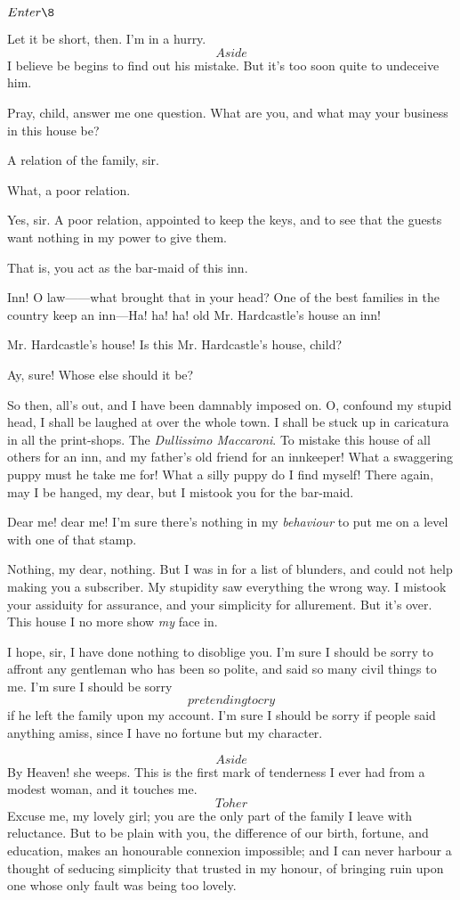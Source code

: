 \documentclass{book}
\begin{document}
\(Enter \8\)


\8  Let it be short, then.  I'm in a hurry.  \[Aside\]  I
believe be begins to find out his mistake.  But it's too soon quite to
undeceive him.

\2  Pray, child, answer me one question.  What are you, and what
may your business in this house be?

\8  A relation of the family, sir.

\2  What, a poor relation.

\8  Yes, sir.  A poor relation, appointed to keep the
keys, and to see that the guests want nothing in my power to give them.

\2  That is, you act as the bar-maid of this inn.

\8  Inn!  O law------what brought that in your head?  One
of the best families in the country keep an inn---Ha! ha! ha! old Mr.
Hardcastle's house an inn!

\2  Mr. Hardcastle's house!  Is this Mr. Hardcastle's house,
child?

\8  Ay, sure!  Whose else should it be?

\2  So then, all's out, and I have been damnably imposed on.  O,
confound my stupid head, I shall be laughed at over the whole town.  I
shall be stuck up in caricatura in all the print-shops.  The
\textit{Dullissimo Maccaroni}.  To mistake this house of all others for an inn, and my
father's old friend for an innkeeper!  What a swaggering puppy must he
take me for!  What a silly puppy do I find myself!  There again, may I
be hanged, my dear, but I mistook you for the bar-maid.

\8  Dear me! dear me!  I'm sure there's nothing in my
\textit{behaviour} to put me on a level with one of that stamp.

\2  Nothing, my dear, nothing.  But I was in for a list of
blunders, and could not help making you a subscriber.  My stupidity saw
everything the wrong way.  I mistook your assiduity for assurance, and
your simplicity for allurement.  But it's over.  This house I no more
show \textit{my} face in.

\8  I hope, sir, I have done nothing to disoblige you. 
I'm sure I should be sorry to affront any gentleman who has been so
polite, and said so many civil things to me.  I'm sure I should be
sorry \[pretending to cry\] if he left the family upon my account.  I'm
sure I should be sorry if people said anything amiss, since I have no
fortune but my character.

\2  \[Aside\]  By Heaven! she weeps.  This is the first mark of
tenderness I ever had from a modest woman, and it touches me.  \[To
her\]  Excuse me, my lovely girl; you are the only part of the family I
leave with reluctance.  But to be plain with you, the difference of our
birth, fortune, and education, makes an honourable connexion
impossible; and I can never harbour a thought of seducing simplicity
that trusted in my honour, of bringing ruin upon one whose only fault
was being too lovely.
\end{document}
